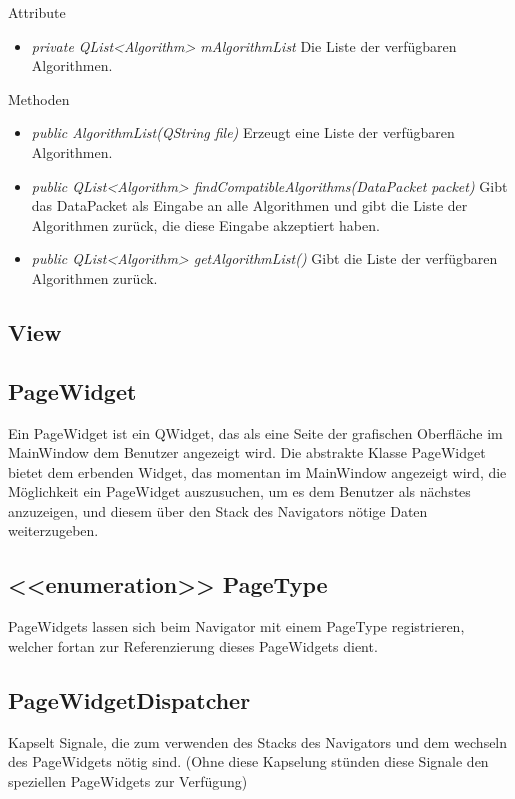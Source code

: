 Attribute
\begin{itemize}
\item\textit{private QList<Algorithm> mAlgorithmList} Die Liste der verfügbaren Algorithmen.
\end{itemize}

Methoden
\begin{itemize}
\item\textit{public AlgorithmList(QString file)} Erzeugt eine Liste der verfügbaren Algorithmen.
\item\textit{public QList<Algorithm> findCompatibleAlgorithms(DataPacket packet)} Gibt das DataPacket als Eingabe an alle Algorithmen und gibt die Liste der Algorithmen zurück, die diese Eingabe akzeptiert haben.
\item\textit{public QList<Algorithm> getAlgorithmList()} Gibt die Liste der verfügbaren Algorithmen zurück.
\end{itemize}

\pagebreak

\subsection{View}
\subsection*{PageWidget}
Ein PageWidget ist ein QWidget, das als eine Seite der grafischen Oberfläche im MainWindow dem Benutzer angezeigt wird. Die abstrakte Klasse PageWidget bietet dem erbenden Widget, das momentan im MainWindow angezeigt wird, die Möglichkeit ein PageWidget auszusuchen, um es dem Benutzer als nächstes anzuzeigen, und diesem über den Stack des Navigators nötige Daten weiterzugeben.

\subsection*{<<enumeration>> PageType}
PageWidgets lassen sich beim Navigator mit einem PageType registrieren, welcher fortan zur Referenzierung dieses PageWidgets dient.

\subsection*{PageWidgetDispatcher}
Kapselt Signale, die zum verwenden des Stacks des Navigators und dem wechseln des PageWidgets nötig sind. (Ohne diese Kapselung stünden diese Signale den speziellen PageWidgets zur Verfügung)

